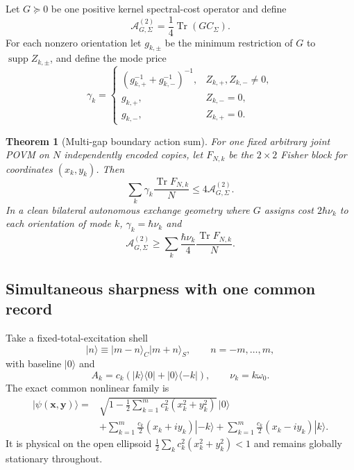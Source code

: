 \documentclass[aps,pra,preprint,nofootinbib]{revtex4-2}
\newtheorem{theorem}{Theorem}
\newcommand{\Tr}{\operatorname{Tr}}
\newcommand{\supp}{\operatorname{supp}}
\newcommand{\Fcl}{F}
\newcommand{\Aact}{\mathcal A}
\begin{document}
Let $G\succeq0$ be one positive kernel spectral-cost operator and define
\begin{equation}
\Aact_{G,\Sigma}^{(2)}=\frac14\Tr(GC_\Sigma).
\end{equation}
For each nonzero orientation let $g_{k,\pm}$ be the minimum restriction of $G$ to $\supp Z_{k,\pm}$, and define the mode price
\begin{equation}
\gamma_k=
\begin{cases}
(g_{k,+}^{-1}+g_{k,-}^{-1})^{-1},&Z_{k,+},Z_{k,-}\ne0,\\
g_{k,+},&Z_{k,-}=0,\\
g_{k,-},&Z_{k,+}=0.
\end{cases}
\label{eq:gammak}
\end{equation}

\begin{theorem}[Multi-gap boundary action sum]
\label{thm:multigap}
For one fixed arbitrary joint POVM on $N$ independently encoded copies, let $\Fcl_{N,k}$ be the $2\times2$ Fisher block for coordinates $(x_k,y_k)$.  Then
\begin{equation}
\boxed{
\sum_k\gamma_k\frac{\Tr \Fcl_{N,k}}{N}
\le4\Aact_{G,\Sigma}^{(2)}.
}
\label{eq:multigap-general}
\end{equation}
In a clean bilateral autonomous exchange geometry where $G$ assigns cost $2\hbar\nu_k$ to each orientation of mode $k$, $\gamma_k=\hbar\nu_k$ and
\begin{equation}
\boxed{
\Aact_{G,\Sigma}^{(2)}
\ge
\sum_k\frac{\hbar\nu_k}{4}
\frac{\Tr \Fcl_{N,k}}{N}.
}
\label{eq:multigap-clean}
\end{equation}
\end{theorem}

\subsection{Simultaneous sharpness with one common record}

Take a fixed-total-excitation shell
\begin{equation}
|n\rangle\equiv |m-n\rangle_C|m+n\rangle_S,
\qquad n=-m,\ldots,m,
\end{equation}
with baseline $|0\rangle$ and
\begin{equation}
A_k=c_k(|k\rangle\!\langle0|+|0\rangle\!\langle-k|),
\qquad \nu_k=k\omega_0.
\label{eq:star-modes}
\end{equation}
The exact common nonlinear family is
\begin{align}
|\psi(\bm x,\bm y)\rangle={}&
\sqrt{1-\frac12\sum_{k=1}^m c_k^2(x_k^2+y_k^2)}\,|0\rangle\nonumber\\
&+\sum_{k=1}^m\frac{c_k}{2}(x_k+i y_k)|-k\rangle
+\sum_{k=1}^m\frac{c_k}{2}(x_k-i y_k)|k\rangle.
\label{eq:star-family}
\end{align}
It is physical on the open ellipsoid $\frac12\sum_k c_k^2(x_k^2+y_k^2)<1$ and remains globally stationary throughout.
\end{document}
